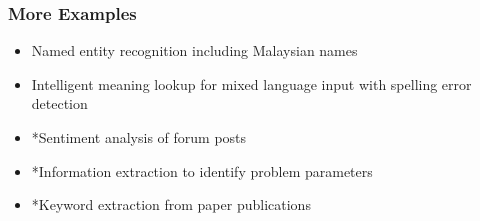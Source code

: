 \begin{frame}
\frametitle{More Examples}
    
\begin{itemize}
\item Named entity recognition including Malaysian names
\item Intelligent meaning lookup for mixed language input with spelling error detection
\item *Sentiment analysis of forum posts
\item *Information extraction to identify problem parameters
\item *Keyword extraction from paper publications
\end{itemize}
 
\end{frame}



